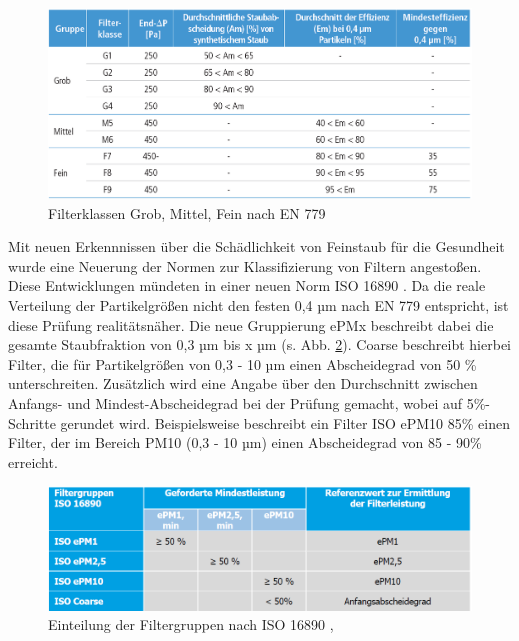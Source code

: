 \begin{figure}[H]
    \begin{center}
        \includegraphics[width=\linewidth]{images/filter_GMF.png}
        \caption[Filterklassen]{Filterklassen Grob, Mittel, Fein nach EN 779}
        \label{fi:filter_gmf}
    \end{center}
\end{figure}
Mit neuen Erkennnissen über die Schädlichkeit von Feinstaub für die Gesundheit wurde eine Neuerung der Normen zur Klassifizierung von Filtern angestoßen. Diese Entwicklungen mündeten in einer neuen Norm ISO 16890 \cite{16890}. Da die reale Verteilung der Partikelgrößen nicht den festen 0,4 µm nach EN 779 entspricht, ist diese Prüfung realitätsnäher. Die neue Gruppierung ePMx beschreibt dabei die gesamte Staubfraktion von 0,3 µm bis x µm (s. Abb. \ref{fi:epmX}). Coarse beschreibt hierbei Filter, die für Partikelgrößen von 0,3 - 10 µm einen Abscheidegrad von 50 \% unterschreiten. Zusätzlich wird eine Angabe über den Durchschnitt zwischen Anfangs- und Mindest-Abscheidegrad bei der Prüfung gemacht, wobei  auf 5\%-Schritte gerundet wird. Beispielsweise beschreibt ein Filter ISO ePM10 85\% einen Filter, der im Bereich PM10 (0,3 - 10 µm) einen Abscheidegrad von 85 - 90\% erreicht.
\begin{figure}[H]
    \begin{center}
        \includegraphics[width=\linewidth]{images/epmX.png}
        \caption[Filtergruppen ISO 16890]{Einteilung der Filtergruppen nach ISO 16890 \cite{altneu}, \cite{16890}}
        \label{fi:epmX}
    \end{center}
\end{figure}
